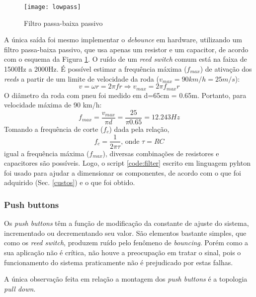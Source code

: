 \documentclass[a4paper,11pt]{article}
\begin{document}
\begin{figure}[ht]
 \begin{center}
  \texttt{[image: lowpass]}
 \end{center}
 \caption{Filtro passa-baixa passivo}
 \label{fig:lowpass}
\end{figure}

A única saída foi mesmo implementar o \textit{debounce} em hardware, utilizando
um filtro passa-baixa passivo, que usa apenas um resistor e um capacitor, de
acordo com o esquema da Figura \ref{fig:lowpass}. O ruído de um \textit{reed
switch} comum está na faixa de 1500Hz a 2000Hz\cite{reed}. É possível estimar a
frequência máxima ($f_{max}$) de ativação dos \textit{reeds} a partir de um
limite de velocidade da roda ($v_{max} = 90 km/h = 25 m/s$):
\begin{equation}
  v = \omega r = 2\pi f r \Rightarrow v_{max} = 2\pi f_{max} r
\end{equation}
O diâmetro da roda com pneu foi medido em d=65cm = 0.65m. Portanto, para
velocidade máxima de 90 km/h:
\begin{equation}
  f_{max} = \frac{\displaystyle v_{max}}{\displaystyle \pi d} =
\frac{\displaystyle 25}{\displaystyle \pi 0.65} = 12.243 Hz
\end{equation}
Tomando a frequência de corte ($f_{c}$) dada pela relação,
\begin{equation}
  f_{c} = \frac{\displaystyle 1}{\displaystyle 2\pi\tau} \text{, onde } \tau =
RC
\end{equation}
igual a frequência máxima ($f_{max}$), diversas combinações de resistores e
capacitores são possíveis. Logo, o script \ref{code:filter} escrito em
linguagem pyhton\cite{python} foi usado para ajudar a dimensionar os
componentes, de acordo com o que foi adquirido (Sec. \ref{custos}) e o que foi
obtido.

\subsubsection{Push buttons}
\label{sec:buttons}
Os \textit{push buttons} têm a função de modificação da constante de ajuste do
sistema, incrementado ou decrementando seu valor. São elementos bastante
simples, que como os \textit{reed switch}, produzem ruído pelo fenômeno de
\textit{bouncing}. Porém como a sua aplicação não é crítica, não houve a
preocupação em tratar o sinal, pois o funcionamento do sistema praticamente não
é prejudicado por estas falhas.

A única observação feita em relação a montagem dos \textit{push buttons} é a
topologia \textit{pull down}.
\end{document}
